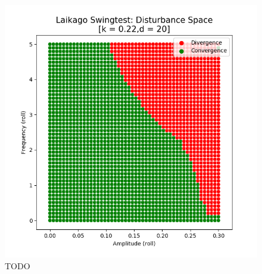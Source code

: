 \begin{figure}[h]
\begin{minipage}{0.33\textwidth}
        \end{minipage}
        \begin{minipage}{0.33\textwidth}
            \centering
            \includegraphics[width=\textwidth]{figures/swingtest_ds_opt_vfinal.png} %
        \end{minipage}

    \caption{TODO}
    \end{figure}


